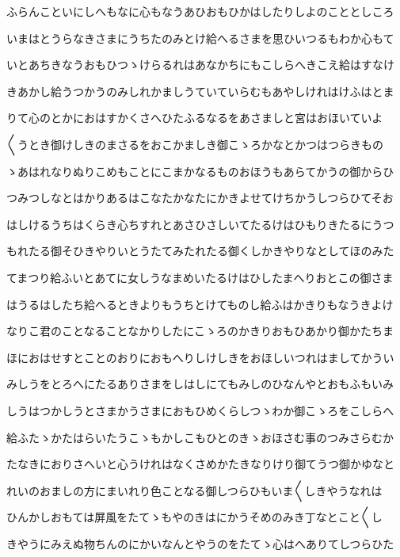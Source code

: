 \documentclass[a4paper,11pt,landscape]{ltjtarticle}
\begin{document}
\par\medskip
ふらんこといにしへもなに心もなうあひおもひかはしたりしよのこととしころ
\par\medskip
いまはとうらなきさまにうちたのみとけ給へるさまを思ひいつるもわか心もて
\par\medskip
いとあちきなうおもひつゝけらるれはあなかちにもこしらへきこえ給はすなけ
\par\medskip
きあかし給うつかうのみしれかましうていていらむもあやしけれはけふはとま
\par\medskip
りて心のとかにおはすかくさへひたふるなるをあさましと宮はおほいていよ
\par\medskip
〱うとき御けしきのまさるをおこかましき御こゝろかなとかつはつらきもの
\par\medskip
ゝあはれなりぬりこめもことにこまかなるものおほうもあらてかうの御からひ
\par\medskip
つみつしなとはかりあるはこなたかなたにかきよせてけちかうしつらひてそお
\par\medskip
はしけるうちはくらき心ちすれとあさひさしいてたるけはひもりきたるにうつ
\par\medskip
もれたる御そひきやりいとうたてみたれたる御くしかきやりなとしてほのみた
\par\medskip
てまつり給ふいとあてに女しうなまめいたるけはひしたまへりおとこの御さま
\par\medskip
はうるはしたち給へるときよりもうちとけてものし給ふはかきりもなうきよけ
\par\medskip
なりこ君のことなることなかりしたにこゝろのかきりおもひあかり御かたちま
\par\medskip
ほにおはせすとことのおりにおもへりしけしきをおほしいつれはましてかうい
\par\medskip
みしうをとろへにたるありさまをしはしにてもみしのひなんやとおもふもいみ
\par\medskip
しうはつかしうとさまかうさまにおもひめくらしつゝわか御こゝろをこしらへ
\par\medskip
給ふたゝかたはらいたうこゝもかしこもひとのきゝおほさむ事のつみさらむか
\par\medskip
たなきにおりさへいと心うけれはなくさめかたきなりけり御てうつ御かゆなと
\par\medskip
れいのおましの方にまいれり色ことなる御しつらひもいま〱しきやうなれは
\par\medskip
ひんかしおもては屏風をたてゝもやのきはにかうそめのみき丁なとこと〱し
\par\medskip
きやうにみえぬ物ちんのにかいなんとやうのをたてゝ心はへありてしつらひた
\par\medskip
\end{document}

